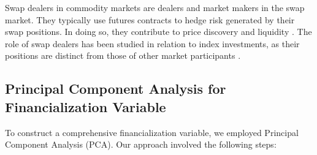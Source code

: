 Swap dealers in commodity markets are dealers and market makers in the swap market. They typically use futures contracts to hedge risk generated by their swap positions. In doing so, they contribute to price discovery and liquidity \citep{brunetti2016}.  The role of swap dealers has been studied  in relation to index investments, as their positions are distinct from those of other market participants \citep{sanders2016}. 

\subsection{Principal Component Analysis for Financialization Variable}
To construct a comprehensive financialization variable, we employed Principal Component Analysis (PCA). Our approach involved the following steps:

